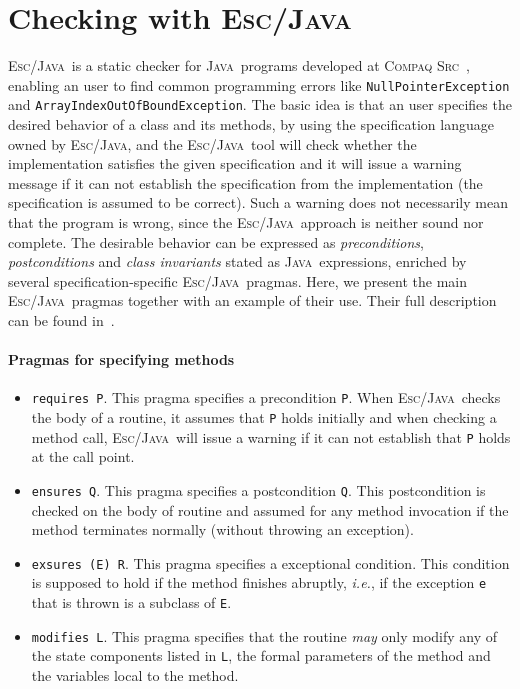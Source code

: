 \documentclass[a4paper]{llncs}
\newcommand{\escj}{\textsc{Esc/Java}}
\newcommand{\java}{\textsc{Java}}
\newcommand{\csrc}{\textsc{Compaq Src}}
\begin{document}
\section{Checking with \escj}
\label{sec-esc-prg}

\escj~is a static checker for \java~programs developed
at \csrc~\cite{ESC}, enabling an user to find common programming errors like
\texttt{NullPointerException} and \texttt{ArrayIndexOutOfBoundException}. The basic idea is that
an user specifies the desired behavior of a class and its methods, by
using the specification language owned by \escj, and 
the \escj~tool will check whether the implementation satisfies the given
specification and it will issue a warning 
message if it can not establish the specification from the
implementation (the specification is assumed to be correct). Such a
warning does not necessarily mean that the program is
wrong, since the \escj~approach is neither sound nor complete. The
desirable behavior can be expressed as
\textit{preconditions}, \textit{postconditions} and \textit{class 
invariants} stated as \java~expressions, enriched by several
specification-specific \escj~pragmas. Here, we present
the main \escj~pragmas together with an example of their
use. Their full description can be found in~\cite{LeinoNS00}. 




\paragraph{\bf Pragmas for specifying methods} 
\begin{itemize} 
\item{\texttt{requires P}.} 
This pragma specifies a precondition {\tt P}. 
When \escj~checks the body of a
routine, it assumes that \texttt{P} holds initially and when checking
a method call, \escj~will issue a warning if 
it can not establish that \texttt{P} holds at the call point. 
 
\item{\texttt{ensures Q}.} 
This pragma specifies a postcondition \texttt{Q}. This postcondition
is checked on the body of routine and assumed for any method
invocation if the method terminates normally (without throwing an
exception).
 
\item{\texttt{exsures (E) R}.} 
This pragma specifies a exceptional condition. This condition is 
supposed to hold if the method finishes abruptly, \emph{i.e.}, if
the exception \texttt{e} that is thrown is a subclass of \texttt{E}. 
 
\item{\texttt{modifies L}.} 
This pragma specifies that the routine \emph{may} only modify any of 
the state components listed in \texttt{L}, the formal parameters of 
the method and the variables local to the method. 
\end{itemize}
 
\end{document}
